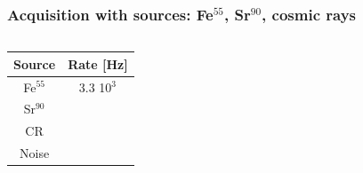     \begin{frame}[noframenumbering]
        \frametitle{Acquisition with sources: Fe$^{55}$, Sr$^{90}$, cosmic rays}
        \begin{columns}
                \begin{table}
                    \tiny
                    \begin{center}
                    \begin{tabular}{|c | c |}
                    \hline
                    Source & Rate [\si{Hz}]\\
                    \hline
                    \hline
                    Fe$^{55}$ & 3.3 10$^3$\\
                    Sr$^{90}$ & \\
                    CR & \\
                    Noise &  \\
                    \hline
                    \end{tabular}
                    \end{center}
                \end{table}


\end{columns}
\end{frame}
